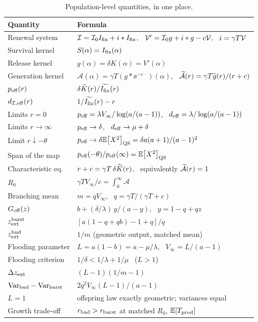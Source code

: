 \begin{table}[htbp]
\centering
\renewcommand{\arraystretch}{1.1}
\small
\begin{tabular}{@{}p{}p{}@{}}
\toprule
Quantity & Formula \\
\midrule
Renewal system & $\mathcal{I}=\mathcal{I}_0I_{\mathrm{fix}}+i*I_{\mathrm{fix}}$, \ $\mathcal{V}'=\mathcal{I}_0 g+i*g-c\mathcal{V}$, \ $i=\gamma T\mathcal{V}$ \\
Survival kernel & $S(\alpha)=I_{\mathrm{fix}}(\alpha)$ \\
Release kernel & $g(\alpha)=\delta K(\alpha)=V'(\alpha)$ \\
Generation kernel & $\mathcal A(\alpha)=\gamma T(g*\ee^{-c\,\cdot})(\alpha)$, \ $\widetilde{\mathcal A}(r)=\gamma T\widetilde{g}(r)/(r+c)$ \\
$p_{\rm eff}(r)$ & $\delta\widetilde{K}(r)/\widetilde{I_{\mathrm{fix}}}(r)$ \\
$d_{\mathcal{I},{\rm eff}}(r)$ & $1/\widetilde{I_{\mathrm{fix}}}(r)-r$ \\
Limits $r=0$ & $p_{\rm eff}=\lambda V_\infty/\log(a/(a-1))$, \ $d_{\rm eff}=\lambda/\log(a/(a-1))$ \\
Limits $r\to\infty$ & $p_{\rm eff}\to\delta$, \ $d_{\rm eff}\to\mu+\delta$ \\
Limit $r\downarrow-\theta$ & $p_{\rm eff}\to\delta\mathbb{E}\!\left[X^2\right]_{\rm QS}=\delta a(a+1)/(a-1)^2$ \\
Span of the map & $p_{\rm eff}(-\theta)/p_{\rm eff}(\infty)=\mathbb{E}\!\left[X^2\right]_{\rm QS}$ \\
Characteristic eq. & $r+c=\gamma T\,\delta\widetilde{K}(r)$, \ equivalently $\widetilde{\mathcal A}(r)=1$ \\
$R_0$ & $\gamma T V_\infty/c=\int_0^\infty\mathcal A$ \\
Branching mean & $m=qV_\infty$, \ $q=\gamma T/(\gamma T+c)$ \\
$G_{\rm off}(z)$ & $b+(\delta/\lambda)\,y/(a-y)$, \ $y=1-q+qz$ \\
$z_{\rm ext}^{\rm burst}$ & $[a(1-q+qb)-1+q]/q$ \\
$z_{\rm ext}^{\rm bud}$ & $1/m$ (geometric output, matched mean) \\
Flooding parameter & $L=a(1-b)=a-\mu/\lambda$, \ $V_\infty=L/(a-1)$ \\
Flooding criterion & $1/\delta<1/\lambda+1/\mu$ \ ($L>1$) \\
$\Delta z_{\rm ext}$ & $(L-1)(1/m-1)$ \\
$\mathrm{Var}_{\rm bud}-\mathrm{Var}_{\rm burst}$ & $2q^2V_\infty(L-1)/(a-1)$ \\
$L=1$ & offspring law exactly geometric; variances equal \\
Growth trade-off & $r_{\rm bud}>r_{\rm burst}$ at matched $R_0$, $\mathbb{E}\!\left[T_{\rm prod}\right]$ \\
\bottomrule
\end{tabular}
\caption{Population-level quantities, in one place.}
\label{p:tab:formulae}
\end{table}

